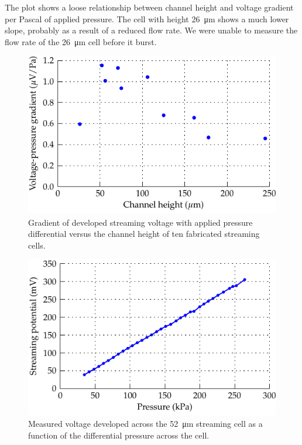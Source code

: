\documentclass[10pt,final,journal]{IEEEtran}
\begin{document}
    The plot shows a loose relationship between channel height and voltage gradient per Pascal of applied pressure.
    The cell with height \SI{26}{\micro\meter} shows a much lower slope, probably as a result of a reduced flow rate.
    We were unable to measure the flow rate of the \SI{26}{\micro\meter} cell before it burst.

    \begin{figure}
        \begin{center}
        \includegraphics[width=\linewidth]{graph_cellEfficiency}
        \end{center}
        \caption{Gradient of developed streaming voltage with applied pressure differential versus the channel height of ten fabricated streaming cells.}
        \label{fig:cellEfficiency}
    \end{figure}

    \begin{figure}
        \begin{center}
        \includegraphics[width=\linewidth]{graph_voltagePressure}
        \end{center}
        \caption{Measured voltage developed across the \SI{52}{\micro\meter} streaming cell as a function of the differential pressure across the cell.}
        \label{fig:cellVoltagePressure}
    \end{figure}
\end{document}
